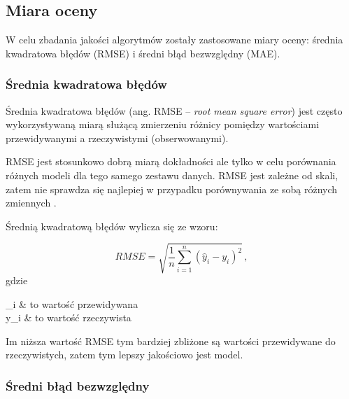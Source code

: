 \documentclass[twoside]{iisthesis}
\begin{document}
	
	
	
		\subsection{Miara oceny}
	
	
		W celu zbadania jakości algorytmów zostały zastosowane miary oceny: średnia kwadratowa błędów (RMSE) i średni błąd bezwzględny (MAE).
		
		\subsubsection{Średnia kwadratowa błędów}
	
		Średnia kwadratowa błędów (ang. RMSE -- \textit{root mean square error}) jest często wykorzystywaną miarą służącą zmierzeniu różnicy pomiędzy wartościami przewidywanymi a rzeczywistymi (obserwowanymi). 
		
		RMSE jest stosunkowo dobrą miarą dokładności ale tylko w celu porównania  różnych modeli dla tego samego zestawu danych. RMSE jest zależne od skali, zatem nie sprawdza się najlepiej w przypadku porównywania ze sobą różnych zmiennych \cite{hyndman2006another}.
		
		Średnią kwadratową błędów wylicza się ze wzoru:
		
		\begin{equation}
			\label{eq:rmse}
			RMSE = \sqrt{ \frac{1}{n} \sum_{i=1}^{n} (\hat{y}_i - y_i)^2 }
			\,,
		\end{equation}	
		gdzie
		
		\begin{conditions*}
			_i & to wartość przewidywana \\
			y_i  &  to wartość rzeczywista
		\end{conditions*} 
		
		Im niższa wartość RMSE tym bardziej zbliżone są wartości przewidywane do rzeczywistych, zatem tym lepszy jakościowo jest model. 
		
		\subsubsection{Średni błąd bezwzględny}
		
\end{document}
